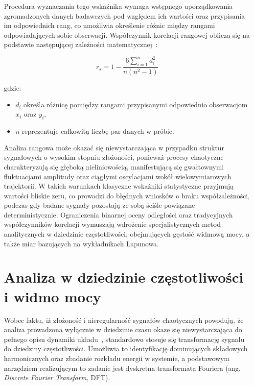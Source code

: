 Procedura wyznaczania tego wskaźnika wymaga wstępnego uporządkowania zgromadzonych danych badawczych pod względem ich wartości oraz przypisania im odpowiednich rang, co umożliwia określenie różnic między rangami odpowiadających sobie obserwacji. Współczynnik korelacji rangowej oblicza się na podstawie następującej zależności matematycznej~\cite{spearman1}:
 
\begin{equation}
r_s = 1 - \frac{6 \sum_{i=1}^{n} d_i^2}{n(n^2 - 1)}
\label{eq:korelacja_spearmana}
\end{equation}
 
gdzie:
\begin{itemize}
    \item $d_i$ określa różnicę pomiędzy rangami przypisanymi odpowiednio obserwacjom $x_i$ oraz $y_i$,
    \item $n$ reprezentuje całkowitą liczbę par danych w próbie.
\end{itemize}
 
Analiza rangowa może okazać się niewystarczająca w przypadku struktur sygnałowych o wysokim stopniu złożoności, ponieważ procesy chaotyczne charakteryzują się głęboką nieliniowością, manifestującą się gwałtownymi fluktuacjami amplitudy oraz ciągłymi oscylacjami wokół wielowymiarowych trajektorii. W takich warunkach klasyczne wskaźniki statystyczne przyjmują wartości bliskie zeru, co prowadzi do błędnych wniosków o braku współzależności, podczas gdy badane sygnały pozostają ze sobą ściśle powiązane deterministycznie. Ograniczenia binarnej oceny odległości oraz tradycyjnych współczynników korelacji wymuszają wdrożenie specjalistycznych metod analitycznych w dziedzinie częstotliwości, obejmujących gęstość widmową mocy, a także miar bazujących na wykładnikach Lapunowa.
 
\section{Analiza w dziedzinie częstotliwości i widmo mocy}
 
Wobec faktu, iż złożoność i nieregularność sygnałów chaotycznych powodują, że analiza prowadzona wyłącznie w dziedzinie czasu okaze się niewystarczająca do pełnego opisu dynamiki układu~\cite{FFT1, FFT2}, standardowo stosuje się transformację sygnału do dziedziny częstotliwości. Umożliwia to identyfikację dominujących składowych harmonicznych oraz zbadanie rozkładu energii w systemie, a podstawowym narzędziem realizującym to zadanie jest dyskretna transformata Fouriera (ang. \textit{Discrete Fourier Transform}, DFT).
 
